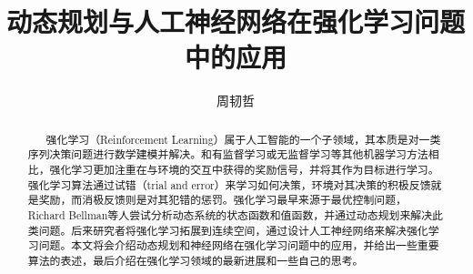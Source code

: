 \documentclass[lang=cn,11pt,a4paper,cite=number]{elegantpaper}
\title{动态规划与人工神经网络在强化学习问题中的应用}
\author{{周韧哲} \quad {zhourz@smail.nju.edu.cn}}
\institute{南京大学 \; 人工智能学院}
\date{}
\begin{document}
\maketitle

\begin{abstract}
$\text{ }\quad$强化学习（Reinforcement Learning）属于人工智能的一个子领域，其本质是对一类序列决策问题进行数学建模并解决。和有监督学习或无监督学习等其他机器学习方法相比，强化学习更加注重在与环境的交互中获得的奖励信号，并将其作为目标进行学习。强化学习算法通过试错（trial and error）来学习如何决策，环境对其决策的积极反馈就是奖励，而消极反馈则是对其犯错的惩罚。强化学习最早来源于最优控制问题，Richard Bellman等人尝试分析动态系统的状态函数和值函数，并通过动态规划来解决此类问题。后来研究者将强化学习拓展到连续空间，通过设计人工神经网络来解决强化学习问题。本文将会介绍动态规划和神经网络在强化学习问题中的应用，并给出一些重要算法的表述，最后介绍在强化学习领域的最新进展和一些自己的思考。
\end{abstract}
\end{document}
